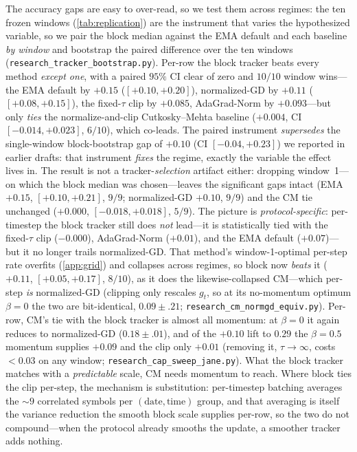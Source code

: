 \documentclass{article}
\newcommand{\gt}{g_t}
\begin{document}
The accuracy gaps are easy to over-read, so we test them across regimes: the ten frozen
windows (\cref{tab:replication}) are the instrument that varies the hypothesized variable, so
we pair the block median against the EMA default and each baseline \emph{by window} and
bootstrap the paired difference over the ten windows
(\texttt{research\_tracker\_bootstrap.py}). Per-row the block tracker beats every method
\emph{except one}, with a paired $95\%$ CI clear of zero and $10/10$ window wins---the EMA
default by $+0.15$ ($[+0.10,+0.20]$), normalized-GD by $+0.11$ ($[+0.08,+0.15]$), the
fixed-$\tau$ clip by $+0.085$, AdaGrad-Norm by $+0.093$---but only \emph{ties} the
normalize-and-clip Cutkosky--Mehta baseline ($+0.004$, CI $[-0.014,+0.023]$, $6/10$), which
co-leads. The paired instrument \emph{supersedes} the single-window block-bootstrap gap of
$+0.10$ (CI $[-0.04,+0.23]$) we reported in earlier drafts: that instrument \emph{fixes} the
regime, exactly the variable the effect lives in. The result is not a tracker-\emph{selection}
artifact either: dropping window~1---on which the block median was chosen---leaves the
significant gaps intact (EMA $+0.15$, $[+0.10,+0.21]$, $9/9$; normalized-GD $+0.10$, $9/9$) and
the CM tie unchanged ($+0.000$, $[-0.018,+0.018]$, $5/9$). The picture is
\emph{protocol-specific}: per-timestep the block tracker still does \emph{not} lead---it is
statistically tied with the fixed-$\tau$ clip ($-0.000$), AdaGrad-Norm ($+0.01$), and the EMA
default ($+0.07$)---but it no longer trails normalized-GD. That method's window-1-optimal
per-step rate overfits (\cref{app:grid}) and collapses across regimes, so block now \emph{beats}
it ($+0.11$, $[+0.05,+0.17]$, $8/10$), as it does the likewise-collapsed CM---which per-step
\emph{is} normalized-GD (clipping only rescales $\gt$, so at its no-momentum optimum $\beta{=}0$
the two are bit-identical, $0.09\!\pm\!.21$; \texttt{research\_cm\_normgd\_equiv.py}). Per-row,
CM's tie with the block tracker is almost all momentum: at $\beta{=}0$ it again reduces to
normalized-GD ($0.18\!\pm\!.01$), and of the $+0.10$ lift to $0.29$ the $\beta{=}0.5$ momentum
supplies ${+}0.09$ and the clip only ${+}0.01$ (removing it, $\tau\!\to\!\infty$, costs
${<}0.03$ on any window; \texttt{research\_cap\_sweep\_jane.py}). What the block tracker matches
with a \emph{predictable} scale, CM needs momentum to reach. Where block ties
the clip per-step, the mechanism is substitution: per-timestep batching averages the $\sim\!9$
correlated symbols per $(\text{date},\text{time})$ group, and that averaging is itself the
variance reduction the smooth block scale supplies per-row, so the two do not compound---when
the protocol already smooths the update, a smoother tracker adds nothing.
\end{document}
